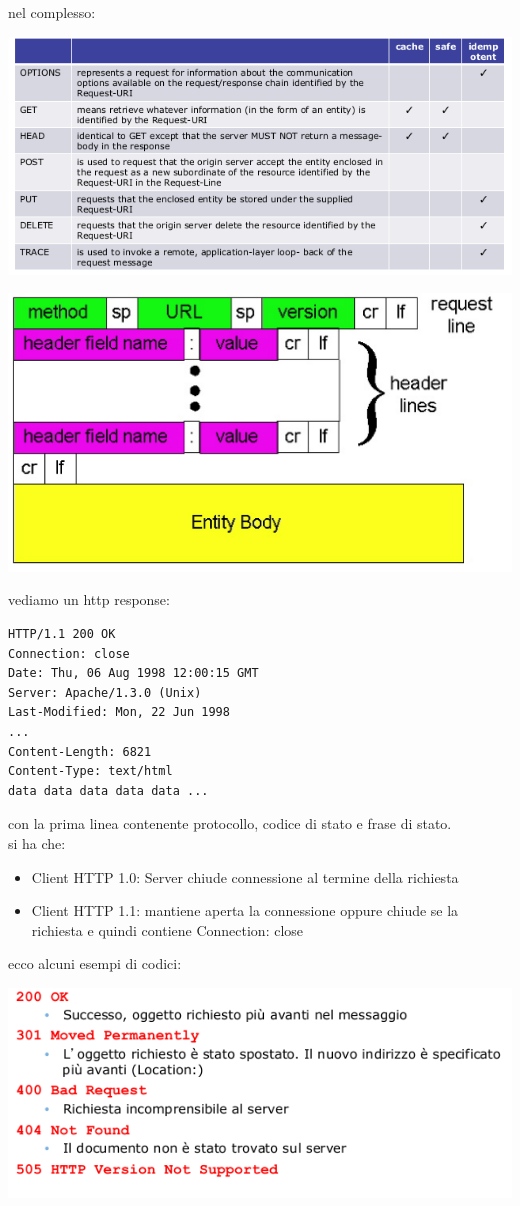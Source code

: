 \documentclass[a4paper,12pt, oneside]{book}
\begin{document}
nel complesso:
\begin{center}
\includegraphics[scale=0.7]{img/http.png}
\end{center}
\begin{center}
\includegraphics[scale=0.7]{img/http2.png}
\end{center}
vediamo un http response:
\begin{verbatim}
HTTP/1.1 200 OK
Connection: close
Date: Thu, 06 Aug 1998 12:00:15 GMT
Server: Apache/1.3.0 (Unix)
Last-Modified: Mon, 22 Jun 1998
...
Content-Length: 6821
Content-Type: text/html
data data data data data ...
\end{verbatim}
con la prima linea contenente protocollo, codice di stato e frase di stato.\\ 
si ha che:
\begin{itemize}
\item Client HTTP 1.0: Server chiude connessione al termine della richiesta
\item Client HTTP 1.1: mantiene aperta la connessione oppure chiude se la richiesta e quindi
contiene Connection: close
\end{itemize}
ecco alcuni esempi di codici:
\begin{center}
\includegraphics[scale=0.7]{img/http3.png}
\end{center}
\end{document}
